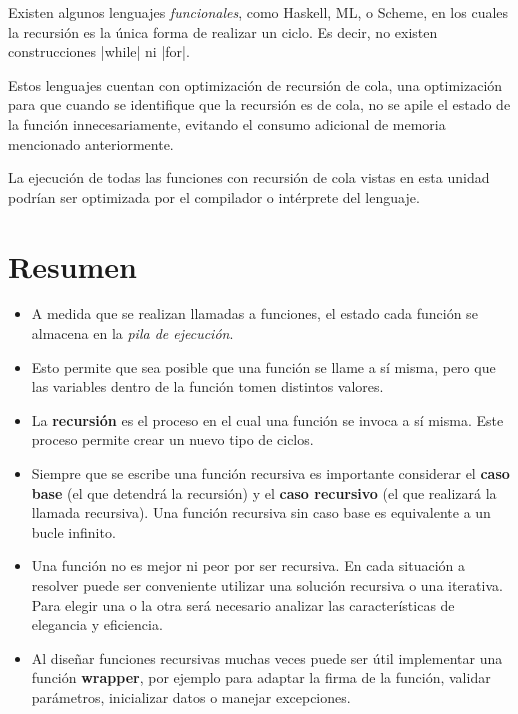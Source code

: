 \begin{sabias_que}
Existen algunos lenguajes \emph{funcionales}, como Haskell, ML, o Scheme, en
los cuales la recursión es la única forma de realizar un ciclo.  Es
decir, no existen construcciones |while| ni |for|.

Estos lenguajes cuentan con optimización de recursión de cola,
una optimización para que cuando se identifique que la recursión es de cola,
no se apile el estado de la función
innecesariamente, evitando el consumo adicional de memoria mencionado
anteriormente.

La ejecución de todas las funciones con recursión de cola vistas en esta
unidad podrían ser optimizada por el compilador o intérprete del lenguaje.
\end{sabias_que}

\section{Resumen}

\begin{itemize}

\item A medida que se realizan llamadas a funciones, el estado cada
función se almacena en la \emph{pila de ejecución}.

\item Esto permite que sea posible que una función se llame a sí misma,
pero que las variables dentro de la función tomen distintos valores.

\item La {\bf recursión} es el proceso en el cual una función se invoca a
sí misma.  Este proceso permite crear un nuevo tipo de ciclos.

\item Siempre que se escribe una función recursiva es importante considerar
el {\bf caso base} (el que detendrá la recursión) y el {\bf caso
recursivo} (el que realizará la llamada recursiva).  Una función recursiva
sin caso base es equivalente a un bucle infinito.

\item Una función no es mejor ni peor por ser recursiva.  En cada situación
a resolver puede ser conveniente utilizar una solución recursiva o una
iterativa.  Para elegir una o la otra será necesario analizar las
características de elegancia y eficiencia.

\item Al diseñar funciones recursivas muchas veces puede ser útil
implementar una función {\bf wrapper}, por ejemplo para adaptar
la firma de la función, validar parámetros, inicializar datos o manejar excepciones.

\end{itemize}


